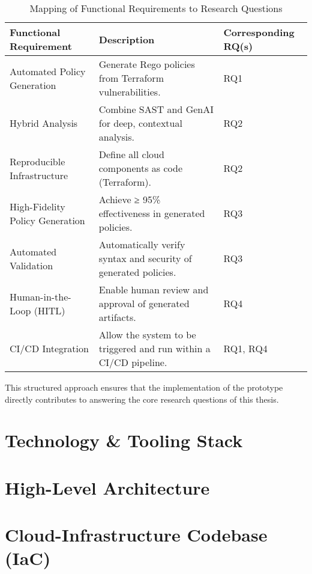 \begin{table}[h!]
\centering
\begin{tabular}{|l|p{6cm}|l|}
\hline
\textbf{Functional Requirement} & \textbf{Description} & \textbf{Corresponding RQ(s)} \\
\hline
Automated Policy Generation & Generate Rego policies from Terraform vulnerabilities. & RQ1 \\
\hline
Hybrid Analysis & Combine SAST and GenAI for deep, contextual analysis. & RQ2 \\
\hline
Reproducible Infrastructure & Define all cloud components as code (Terraform). & RQ2 \\
\hline
High-Fidelity Policy Generation & Achieve ≥ 95\% effectiveness in generated policies. & RQ3 \\
\hline
Automated Validation & Automatically verify syntax and security of generated policies. & RQ3 \\
\hline
Human-in-the-Loop (HITL) & Enable human review and approval of generated artifacts. & RQ4 \\
\hline
CI/CD Integration & Allow the system to be triggered and run within a CI/CD pipeline. & RQ1, RQ4 \\
\hline
\end{tabular}
\caption{Mapping of Functional Requirements to Research Questions}
\label{tab:req_rq_mapping}
\end{table}

This structured approach ensures that the implementation of the prototype directly contributes to answering the core research questions of this thesis.

\section{Technology & Tooling Stack}

\section{High-Level Architecture}

\section{Cloud-Infrastructure Codebase (IaC)}

